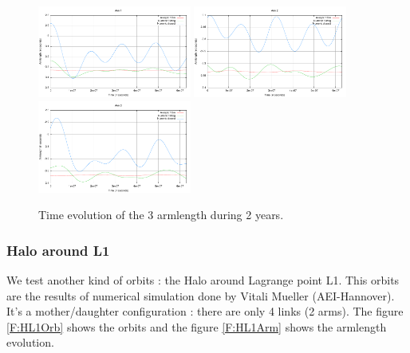 \documentclass{iopart}
\begin{document}
\begin{figure}[H]
\begin{center}
\includegraphics[width=0.45\textwidth]{FigNoiseOrbSens/Arm-1_LISA-CLISA-10LISA}
\includegraphics[width=0.45\textwidth]{FigNoiseOrbSens/Arm-2_LISA-CLISA-10LISA}
\includegraphics[width=0.45\textwidth]{FigNoiseOrbSens/Arm-3_LISA-CLISA-10LISA} 
\end{center}
\caption{Time evolution of the 3 armlength during 2 years.
\label{F:ArmEvol} } 
\end{figure}

\subsubsection{Halo around L1}
\label{SS:Inst:Orb:HL1}

We test another kind of orbits : the Halo around Lagrange point L1.
This orbits are the results of numerical simulation done by Vitali Mueller (AEI-Hannover).
It's a mother/daughter configuration : there are only 4 links (2 arms).
The figure \ref{F:HL1Orb} shows the orbits and the figure \ref{F:HL1Arm} shows the armlength evolution.
\end{document}
